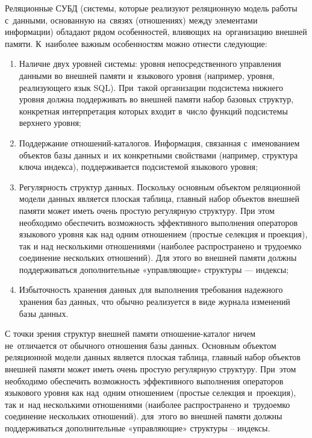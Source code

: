 \documentclass{ou}
\begin{document}
Реляционные СУБД (системы, которые реализуют реляционную модель работы с~данными, основанную на~связях (отношениях) между элементами информации) обладают рядом особенностей, влияющих на~организацию внешней памяти. К~наиболее важным особенностям можно отнести следующие:
\begin{enumerate}[leftmargin=0em, itemindent=3.75em, nosep, label=\arabic*)]
\item Наличие двух уровней системы: уровня непосредственного управления данными во внешней памяти и~языкового уровня (например, уровня, реализующего язык SQL). При~такой организации подсистема нижнего уровня должна поддерживать во внешней памяти набор базовых структур, конкретная интерпретация которых входит в~число функций подсистемы верхнего уровня;
\item Поддержание отношений-каталогов. Информация, связанная с~именованием объектов базы данных и~их конкретными свойствами (например, структура ключа индекса), поддерживается подсистемой языкового уровня;
\item Регулярность структур данных. Поскольку основным объектом реляционной модели данных является плоская таблица, главный набор объектов внешней памяти может иметь очень простую регулярную структуру. При этом необходимо обеспечить возможность эффективного выполнения операторов языкового уровня как над одним отношением (простые селекция и проекция), так и над несколькими отношениями (наиболее распространено и трудоемко соединение нескольких отношений). Для этого во внешней памяти должны поддерживаться дополнительные «управляющие» структуры — индексы;
\item Избыточность хранения данных для выполнения требования надежного хранения баз данных, что обычно реализуется в виде журнала изменений базы данных.
\end{enumerate}

С точки зрения структур внешней памяти отношение-каталог ничем не~отличается от обычного отношения базы данных. Основным объектом реляционной модели данных является плоская таблица, главный набор объектов внешней памяти может иметь очень простую регулярную структуру. При~этом необходимо обеспечить возможность эффективного выполнения операторов языкового уровня как над~одним отношением (простые селекция и~проекция), так и~над несколькими отношениями (наиболее распространено и~трудоемко соединение нескольких отношений). для~этого во внешней памяти должны поддерживаться дополнительные «управляющие» структуры -- индексы\cite{Sergeev2012}.
\end{document}
